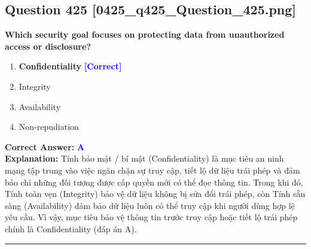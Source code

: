 \documentclass[11pt,a4paper]{article}
\begin{document}
\begin{minipage}{\textwidth}
\subsection*{Question 425 \quad \footnotesize{[0425\_q425\_Question\_425.png]}}
\noindent \textbf{Which security goal focuses on protecting data from unauthorized access or disclosure?}

\begin{enumerate}[label=\Alph*.]
    \item \textbf{Confidentiality} \hfill \textcolor{blue}{\textbf{[Correct]}}
    \item Integrity
    \item Availability
    \item Non-repudiation
\end{enumerate}

\noindent \textbf{Correct Answer:} \textcolor{blue}{\textbf{A}} \\[2pt]
\noindent \textbf{Explanation:} Tính bảo mật / bí mật (Confidentiality) là mục tiêu an ninh mạng tập trung vào việc ngăn chặn sự truy cập, tiết lộ dữ liệu trái phép và đảm bảo chỉ những đối tượng được cấp quyền mới có thể đọc thông tin. Trong khi đó, Tính toàn vẹn (Integrity) bảo vệ dữ liệu không bị sửa đổi trái phép, còn Tính sẵn sàng (Availability) đảm bảo dữ liệu luôn có thể truy cập khi người dùng hợp lệ yêu cầu. Vì vậy, mục tiêu bảo vệ thông tin trước truy cập hoặc tiết lộ trái phép chính là Confidentiality (đáp án A).

\par\vspace{0.3cm}
\hrule
\vspace{0.3cm}
\end{minipage}
\end{document}
